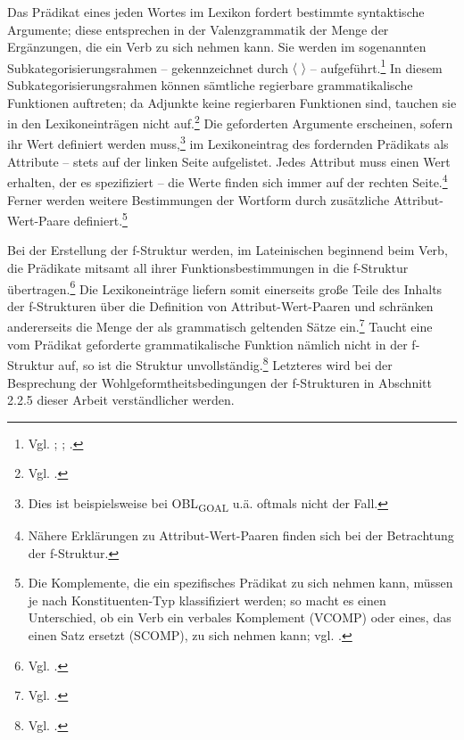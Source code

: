 \documentclass[12pt,a4paper]{article}
\begin{document}
Das Prädikat eines jeden Wortes im Lexikon fordert bestimmte syntaktische Argumente; diese entsprechen in der Valenzgrammatik der Menge der Ergänzungen, die ein Verb zu sich nehmen kann. Sie werden im sogenannten Subkategorisierungsrahmen -- gekennzeichnet durch $\langle$ $\rangle$ -- aufgeführt.\footnote{Vgl. \cite[7]{Dal}; \cite[70]{Skript}; \cite[27]{Rohrer}.} In diesem Subkategorisierungsrahmen können sämtliche regierbare grammatikalische Funktionen auftreten; da Adjunkte keine regierbaren Funktionen sind, tauchen sie in den Lexikoneinträgen nicht auf.\footnote{Vgl. \cite[27]{Rohrer}.} Die geforderten Argumente erscheinen, sofern ihr Wert definiert werden muss,\footnote{Dies ist beispielsweise bei OBL\textsubscript{GOAL} u.ä. oftmals nicht der Fall.} im Lexikoneintrag des fordernden Prädikats als Attribute -- stets auf der linken Seite aufgelistet. Jedes Attribut muss einen Wert erhalten, der es spezifiziert -- die Werte finden sich immer auf der rechten Seite.\footnote{Nähere Erklärungen zu Attribut-Wert-Paaren finden sich bei der Betrachtung der f-Struktur.} Ferner werden weitere Bestimmungen der Wortform durch zusätzliche Attribut-Wert-Paare definiert.\footnote{Die Komplemente, die ein spezifisches Prädikat zu sich nehmen kann, müssen je nach Konstituenten-Typ klassifiziert werden; so macht es einen Unterschied, ob ein Verb ein verbales Komplement (VCOMP) oder eines, das einen Satz ersetzt (SCOMP), zu sich nehmen kann; vgl. \cite[22]{Rohrer}.}

Bei der Erstellung der f-Struktur werden, im Lateinischen beginnend beim Verb, die Prädikate mitsamt all ihrer Funktionsbestimmungen in die f-Struktur übertragen.\footnote{Vgl. \cite[28]{Rohrer}.} Die Lexikoneinträge liefern somit einerseits große Teile des Inhalts der f-Strukturen über die Definition von Attribut-Wert-Paaren und schränken andererseits die Menge der als grammatisch geltenden Sätze ein.\footnote{Vgl. \cite[63]{Skript}.}  Taucht eine vom Prädikat geforderte grammatikalische Funktion nämlich nicht in der f-Struktur auf, so ist die Struktur unvollständig.\footnote{Vgl. \cite[28]{Rohrer}.} Letzteres wird bei der Besprechung der Wohlgeformtheitsbedingungen der f-Strukturen in Abschnitt 2.2.5 dieser Arbeit verständlicher werden.
\end{document}
